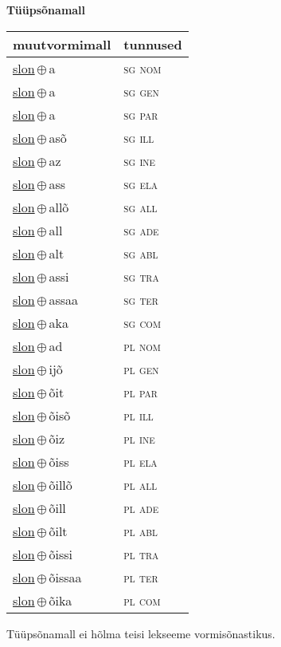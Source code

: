 

\vspace{3.5em}
\noindent \begin{minipage}{\textwidth}
\noindent \textbf{Tüüpsõnamall \,}\\

\begin{sideways}
\begin{tabular}{l l}
muutvormimall & tunnused \\
\hline
\underline{slon}\,$\oplus$\,a & \textsc{ sg nom } \\
\underline{slon}\,$\oplus$\,a & \textsc{ sg gen } \\
\underline{slon}\,$\oplus$\,a & \textsc{ sg par } \\
\underline{slon}\,$\oplus$\,asõ & \textsc{ sg ill } \\
\underline{slon}\,$\oplus$\,az & \textsc{ sg ine } \\
\underline{slon}\,$\oplus$\,ass & \textsc{ sg ela } \\
\underline{slon}\,$\oplus$\,allõ & \textsc{ sg all } \\
\underline{slon}\,$\oplus$\,all & \textsc{ sg ade } \\
\underline{slon}\,$\oplus$\,alt & \textsc{ sg abl } \\
\underline{slon}\,$\oplus$\,assi & \textsc{ sg tra } \\
\underline{slon}\,$\oplus$\,assaa & \textsc{ sg ter } \\
\underline{slon}\,$\oplus$\,aka & \textsc{ sg com } \\
\underline{slon}\,$\oplus$\,ad & \textsc{ pl nom } \\
\underline{slon}\,$\oplus$\,ijõ & \textsc{ pl gen } \\
\underline{slon}\,$\oplus$\,õit & \textsc{ pl par } \\
\underline{slon}\,$\oplus$\,õisõ & \textsc{ pl ill } \\
\underline{slon}\,$\oplus$\,õiz & \textsc{ pl ine } \\
\underline{slon}\,$\oplus$\,õiss & \textsc{ pl ela } \\
\underline{slon}\,$\oplus$\,õillõ & \textsc{ pl all } \\
\underline{slon}\,$\oplus$\,õill & \textsc{ pl ade } \\
\underline{slon}\,$\oplus$\,õilt & \textsc{ pl abl } \\
\underline{slon}\,$\oplus$\,õissi & \textsc{ pl tra } \\
\underline{slon}\,$\oplus$\,õissaa & \textsc{ pl ter } \\
\underline{slon}\,$\oplus$\,õika & \textsc{ pl com } \\
\end{tabular}
\end{sideways}
\label{tab:tüüpsõnamall-slona}

\end{minipage}

 
\vspace{1em}
\noindent Tüüpsõnamall  ei hõlma teisi lekseeme vormi\-sõnastikus.
